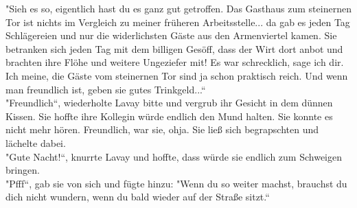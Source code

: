 "Sieh es so, eigentlich hast du es ganz gut getroffen. Das Gasthaus zum steinernen Tor ist nichts 
im Vergleich zu meiner früheren Arbeitsstelle... da gab es jeden Tag Schlägereien und nur die 
widerlichsten Gäste aus den Armenviertel kamen. Sie betranken sich jeden Tag mit dem billigen 
Gesöff, dass der Wirt dort anbot und brachten ihre Flöhe und weitere Ungeziefer mit! Es war 
schrecklich, sage ich dir. Ich meine, die Gäste vom steinernen Tor sind ja schon praktisch reich. 
Und wenn man freundlich ist, geben sie gutes Trinkgeld...``\\
"Freundlich``, wiederholte Lavay bitte und vergrub ihr Gesicht in dem dünnen Kissen. Sie hoffte 
ihre Kollegin würde endlich den Mund halten. Sie konnte es nicht mehr hören. Freundlich, war sie, 
ohja. Sie ließ sich begrapschten und lächelte dabei.\\
"Gute Nacht!``, knurrte Lavay und hoffte, dass würde sie endlich zum Schweigen bringen.\\
"Pfff``, gab sie von sich und fügte hinzu: "Wenn du so weiter machst, brauchst du dich nicht 
wundern, wenn du bald wieder auf der Straße sitzt.``\\

